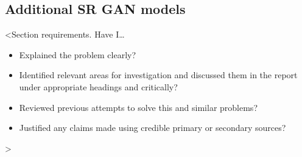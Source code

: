 \subsection{Additional SR GAN models}

<Section requirements. Have I\dots
\begin{itemize}
    \item Explained the problem clearly?
    \item Identified relevant areas for investigation and discussed them in the report under appropriate headings and critically?
    \item Reviewed previous attempts to solve this and similar problems?
    \item Justified any claims made using credible primary or secondary sources?
\end{itemize}
>
